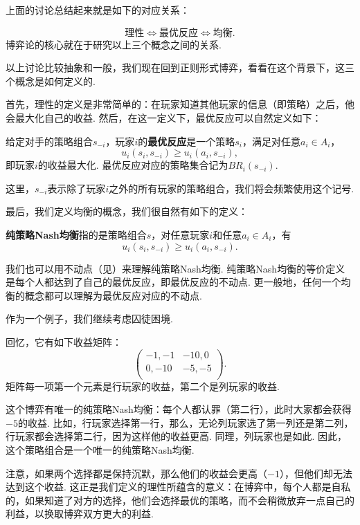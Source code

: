 上面的讨论总结起来就是如下的对应关系：

\[
\text{理性}\iff\text{最优反应}\iff\text{均衡}.
\]
博弈论的核心就在于研究以上三个概念之间的关系.

以上讨论比较抽象和一般，我们现在回到正则形式博弈，看看在这个背景下，这三个概念是如何定义的.

首先，理性的定义是非常简单的：在玩家知道其他玩家的信息（即策略）之后，他会最大化自己的收益. 然后，在这一定义下，最优反应可以自然定义如下：

\begin{definition}[最优反应]
给定对手的策略组合$s_{-i}$，玩家$i$的\textbf{最优反应}是一个策略$s_i$，满足对任意$a_i\in A_i$，
    \[u_i(s_i,s_{-i})\geq u_i(a_i,s_{-i}),\]
即玩家$i$的收益最大化. 最优反应对应的策略集合记为$BR_i(s_{-i})$.
\end{definition}
这里，$s_{-i}$表示除了玩家$i$之外的所有玩家的策略组合，我们将会频繁使用这个记号.

最后，我们定义均衡的概念，我们很自然有如下的定义：

\begin{definition}[纯策略Nash均衡]
\textbf{纯策略Nash均衡}指的是策略组合$s$，对任意玩家$i$和任意$a_i\in A_i$，有
    \[u_i(s_i,s_{-i})\geq u_i(a_i,s_{-i}).\]
\end{definition}

我们也可以用不动点（见）来理解纯策略Nash均衡. 纯策略Nash均衡的等价定义是每个人都达到了自己的最优反应，即最优反应的不动点. 更一般地，任何一个均衡的概念都可以理解为最优反应对应的不动点.

作为一个例子，我们继续考虑囚徒困境.
\begin{example}[囚徒困境的纯策略Nash均衡]
回忆，它有如下收益矩阵：
\[
\begin{pmatrix}
-1,-1&-10,0\\
0,-10&-5,-5\\
\end{pmatrix}.
\]
矩阵每一项第一个元素是行玩家的收益，第二个是列玩家的收益. 

这个博弈有唯一的纯策略Nash均衡：每个人都认罪（第二行），此时大家都会获得$-5$的收益. 比如，行玩家选择第一行，那么，无论列玩家选了第一列还是第二列，行玩家都会选择第二行，因为这样他的收益更高. 同理，列玩家也是如此. 因此，这个策略组合是一个唯一的纯策略Nash均衡.

注意，如果两个选择都是保持沉默，那么他们的收益会更高（$-1$），但他们却无法达到这个收益. 这正是我们定义的理性所蕴含的意义：在博弈中，每个人都是自私的，如果知道了对方的选择，他们会选择最优的策略，而不会稍微放弃一点自己的利益，以换取博弈双方更大的利益.
\end{example}

